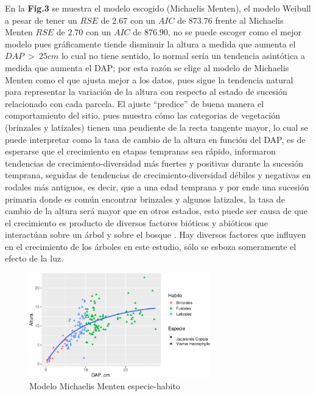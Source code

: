 \documentclass[letterpaper,9pt,onecolumn,twoside,]{pinp}
\begin{document}
En la \textbf{Fig.3} se muestra el modelo escogido (Michaelis Menten),
el modelo Weibull a pesar de tener un \(RSE\) de \(2.67\) con un \(AIC\)
de \(873.76\) frente al Michaelis Menten \(RSE\) de \(2.70\) con un
\(AIC\) de \(876.90\), no se puede escoger como el mejor modelo pues
gráficamente tiende disminuir la altura a medida que aumenta el
\(DAP \ > \ 25cm\) lo cual no tiene sentido, lo normal sería un tendencia
asintótica a medida que aumenta el DAP; por esta razón se elige al
modelo de Michaelis Menten como el que ajusta mejor a los datos,
pues sigue la tendencia natural para representar la variación de la
altura con respecto al estado de sucesión relacionado con cada parcela.
El ajuste ``predice'' de buena manera el comportamiento del sitio, pues
muestra cómo las categorias de vegetación (brinzales y latizales) tienen una
pendiente de la recta tangente mayor, lo cual se puede interpretar como
la tasa de cambio de la altura en función del DAP, es de esperarse que
el crecimiento en etapas tempranas sea rápido, \citep{lasky} informaron
tendencias de crecimiento-diversidad más fuertes y positivas durante la
sucesión temprana, seguidas de tendencias de crecimiento-diversidad
débiles y negativas en rodales más antiguos, es decir, que a una edad
temprana y por ende una sucesión primaria donde es común encontrar
brinzales y algunos latizales, la tasa de cambio de la altura será mayor
que en otros estados, esto puede ser causa de que el crecimiento es
producto de diversos factores bióticos y abióticos que interactúan
sobre un árbol y sobre el bosque \citep{forest}. Hay diversos factores
que influyen en el crecimiento de los árboles en este estudio, sólo se
esboza someramente el efecto de la luz.


\begin{figure}

{\centering \includegraphics[width=0.7\textwidth]{report_ecology_files/figure-latex/unnamed-chunk-6-1} 

}

\caption{Modelo Michaelis Menten especie-habito}\label{fig:unnamed-chunk-6}
\end{figure}
\end{document}
